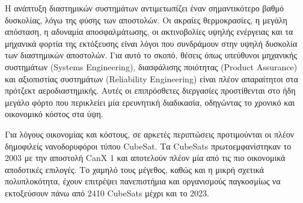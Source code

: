 \documentclass[a4paper,nobib,justified]{tufte-book}
\begin{document}
Η ανάπτυξη διαστημικών συστημάτων αντιμετωπίζει έναν σημαντικότερο βαθμό δυσκολίας, λόγω της φύσης των αποστολών. Οι ακραίες θερμοκρασίες, η μεγάλη απόσταση, η αδυναμία αποσφαλμάτωσης, οι ακτινοβολίες υψηλής ενέργειας και τα μηχανικά φορτία της εκτόξευσης είναι λόγοι που συνδράμουν στην υψηλή δυσκολία των διαστημικών αποστολών. Για αυτό το σκοπό, θέσεις όπως υπεύθυνοι μηχανικής συστημάτων (Systems Engineering), διασφάλισης ποιότητας (Product Assurance) και αξιοπιστίας συστημάτων (Reliability Engineering) είναι πλέον απαραίτητοι στα πρότζεκτ αεροδιαστημικής. Αυτές οι επιπρόσθετες διεργασίες προστίθενται στο ήδη μεγάλο φόρτο που περικλείει μία ερευνητική διαδικασία, οδηγώντας το χρονικό και οικονομικό κόστος στα ύψη.

Για λόγους οικονομίας και κόστους, σε αρκετές περιπτώσεις προτιμούνται οι πλέον δημοφιλείς νανοδορυφόροι τύπου CubeSat. Τα CubeSats πρωτοεμφανίστηκαν το 2003 με την αποστολή CanX 1  και αποτελούν πλέον μία από τις πιο οικονομικά αποδοτικές επιλογές. Το χαμηλό τους μέγεθος, καθώς και η μικρή σχετικά πολυπλοκότητα, έχουν επιτρέψει πανεπιστήμια και οργανισμούς παγκοσμίως να εκτοξεύσουν πάνω από 2410 CubeSats μέχρι και το 2023.
\end{document}
